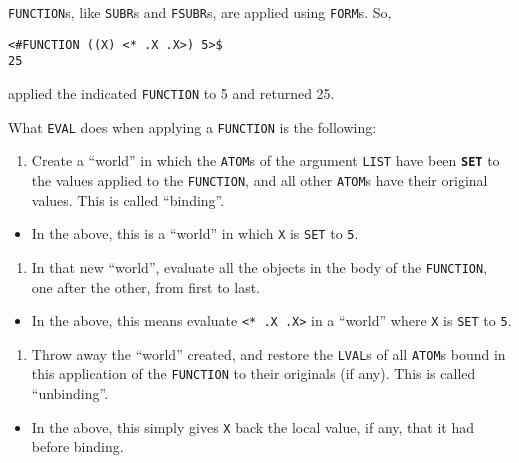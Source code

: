 \documentclass[a4paper,]{article}
\providecommand{\tightlist}{%
  \setlength{\itemsep}{0pt}\setlength{\parskip}{0pt}}
\begin{document}
\texttt{FUNCTION}s, like \texttt{SUBR}s and \texttt{FSUBR}s, are applied using \texttt{FORM}s. So,

\begin{verbatim}
<#FUNCTION ((X) <* .X .X>) 5>$
25
\end{verbatim}

applied the indicated \texttt{FUNCTION} to 5 and returned 25.

What \texttt{EVAL} does when applying a \texttt{FUNCTION} is the following:

\begin{enumerate}
\def\labelenumi{\arabic{enumi}.}
\tightlist
\item
  Create a ``world'' in which the \texttt{ATOM}s of the argument \texttt{LIST} have been \textbf{\texttt{SET}}
   to the values applied to the \texttt{FUNCTION}, and all other \texttt{ATOM}s have their original
  values. This is called ``binding''.
\end{enumerate}

\begin{itemize}
\tightlist
\item
  In the above, this is a ``world'' in which \texttt{X} is \texttt{SET} to \texttt{5}.
\end{itemize}

\begin{enumerate}
\def\labelenumi{\arabic{enumi}.}
\setcounter{enumi}{1}
\tightlist
\item
  In that new ``world'', evaluate all the objects in the body of the \texttt{FUNCTION}, one after the other, from first to
  last.
\end{enumerate}

\begin{itemize}
\tightlist
\item
  In the above, this means evaluate \texttt{\textless{}*\ .X\ .X\textgreater{}} in a ``world'' where \texttt{X} is
  \texttt{SET} to \texttt{5}.
\end{itemize}

\begin{enumerate}
\def\labelenumi{\arabic{enumi}.}
\setcounter{enumi}{2}
\tightlist
\item
  Throw away the ``world'' created, and restore the \texttt{LVAL}s of all \texttt{ATOM}s bound in this
  application of the \texttt{FUNCTION} to their originals (if any). This is called ``unbinding''.
\end{enumerate}

\begin{itemize}
\tightlist
\item
  In the above, this simply gives \texttt{X} back the local value, if any, that it had before binding.
\end{itemize}
\end{document}
